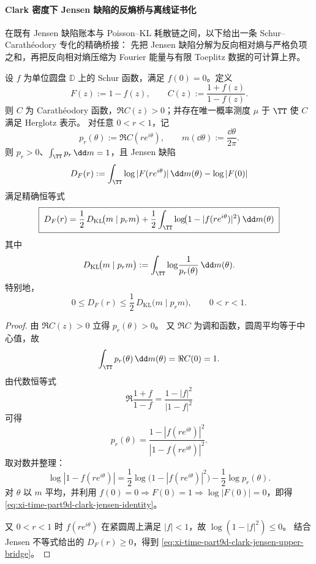 \paragraph{Clark 密度下 Jensen 缺陷的反熵桥与离线证书化}
在既有 Jensen 缺陷账本与 Poisson--KL 耗散链之间，以下给出一条 Schur--Carath\'eodory 专化的精确桥接：
先把 Jensen 缺陷分解为反向相对熵与严格负项之和，再把反向相对熵压缩为 Fourier 能量与有限 Toeplitz 数据的可计算上界。

\begin{theorem}\label{thm:xi-time-part9d-clark-jensen-reversekl-identity}
设 \(f\) 为单位圆盘 \(\mathbb D\) 上的 Schur 函数，满足 \(f(0)=0\)。定义
\[
F(z):=1-f(z),\qquad
C(z):=\frac{1+f(z)}{1-f(z)}.
\]
则 \(C\) 为 Carath\'eodory 函数，\(\Re C(z)>0\)；并存在唯一概率测度 \(\mu\) 于 \(\TT\) 使 \(C\) 满足 Herglotz 表示。
对任意 \(0<r<1\)，记
\[
p_r(\theta):=\Re C(re^{i\theta}),\qquad
m(\dd\theta):=\frac{\dd\theta}{2\pi}.
\]
则 \(p_r>0\)、\(\int_{\TT}p_r\,\dd m=1\)，且 Jensen 缺陷
\[
D_F(r):=\int_{\TT}\log|F(re^{i\theta})|\,\dd m(\theta)-\log|F(0)|
\]
满足精确恒等式
\begin{equation}\label{eq:xi-time-part9d-clark-jensen-identity}
\boxed{\;
D_F(r)
=\frac12\,D_{\mathrm{KL}}\!\bigl(m\mid p_rm\bigr)
+\frac12\int_{\TT}\log\!\bigl(1-|f(re^{i\theta})|^2\bigr)\,\dd m(\theta)\;}
\end{equation}
其中
\[
D_{\mathrm{KL}}\!\bigl(m\mid p_rm\bigr)
:=\int_{\TT}\log\!\frac{1}{p_r(\theta)}\,\dd m(\theta).
\]
特别地，
\begin{equation}\label{eq:xi-time-part9d-clark-jensen-upper-bridge}
0\le D_F(r)\le \frac12\,D_{\mathrm{KL}}\!\bigl(m\mid p_rm\bigr),\qquad 0<r<1.
\end{equation}
\end{theorem}
\begin{proof}
由 \(\Re C(z)>0\) 立得 \(p_r(\theta)>0\)。
又 \(\Re C\) 为调和函数，圆周平均等于中心值，故
\[
\int_{\TT}p_r(\theta)\,\dd m(\theta)=\Re C(0)=1.
\]
由代数恒等式
\[
\Re\frac{1+f}{1-f}=\frac{1-|f|^2}{|1-f|^2}
\]
可得
\[
p_r(\theta)=\frac{1-|f(re^{i\theta})|^2}{|1-f(re^{i\theta})|^2}.
\]
取对数并整理：
\[
\log|1-f(re^{i\theta})|
=\frac12\log\!\bigl(1-|f(re^{i\theta})|^2\bigr)-\frac12\log p_r(\theta).
\]
对 \(\theta\) 以 \(m\) 平均，并利用 \(f(0)=0\Rightarrow F(0)=1\Rightarrow \log|F(0)|=0\)，即得
\eqref{eq:xi-time-part9d-clark-jensen-identity}。

又 \(0<r<1\) 时 \(f(re^{i\theta})\) 在紧圆周上满足 \(|f|<1\)，故
\(
\log(1-|f|^2)\le 0
\)。
结合 Jensen 不等式给出的 \(D_F(r)\ge0\)，得到
\eqref{eq:xi-time-part9d-clark-jensen-upper-bridge}。
\end{proof}

